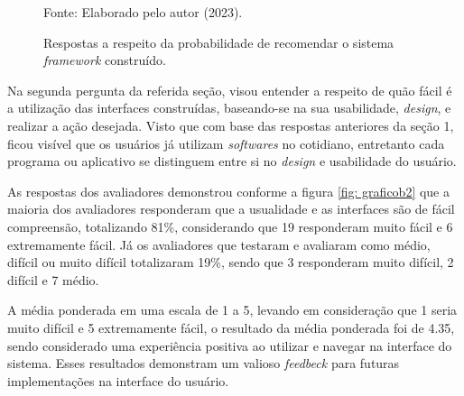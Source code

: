 \documentclass[
	12pt,				%
	openright,			%
	oneside,			%
	a4paper,			%
	english,			%
	french,				%
	spanish,			%
	brazil,				%
	]{abntex2}
\begin{document}
\begin{figure}[ht]
    \centering
    \caption{Respostas a respeito da probabilidade de recomendar o sistema \textit{framework} construído.}
    \label{fig: graficob1}
    
    \centering \small Fonte: Elaborado pelo autor (2023).
\end{figure}

Na segunda pergunta da referida seção, visou entender a respeito de quão fácil é a utilização das interfaces construídas, baseando-se na sua usabilidade, \textit{design}, e realizar a ação desejada. Visto que com base das respostas anteriores da seção 1, ficou visível que os usuários já utilizam \textit{softwares} no cotidiano, entretanto cada programa ou aplicativo se distinguem entre si no \textit{design} e usabilidade do usuário.

As respostas dos avaliadores demonstrou conforme a figura \ref{fig: graficob2} que a maioria dos avaliadores responderam que a usualidade e as interfaces são de fácil compreensão, totalizando 81\%, considerando que 19 responderam muito fácil e 6 extremamente fácil. Já os avaliadores que testaram e avaliaram como médio, difícil ou muito difícil totalizaram 19\%, sendo que 3 responderam muito difícil, 2 difícil e 7 médio.

A média ponderada em uma escala de 1 a 5, levando em consideração que 1 seria muito difícil e 5 extremamente fácil, o resultado da média ponderada foi de 4.35, sendo considerado uma experiência positiva ao utilizar e navegar na interface do sistema. Esses resultados demonstram um valioso \textit{feedbeck} para futuras implementações na interface do usuário.
\end{document}
